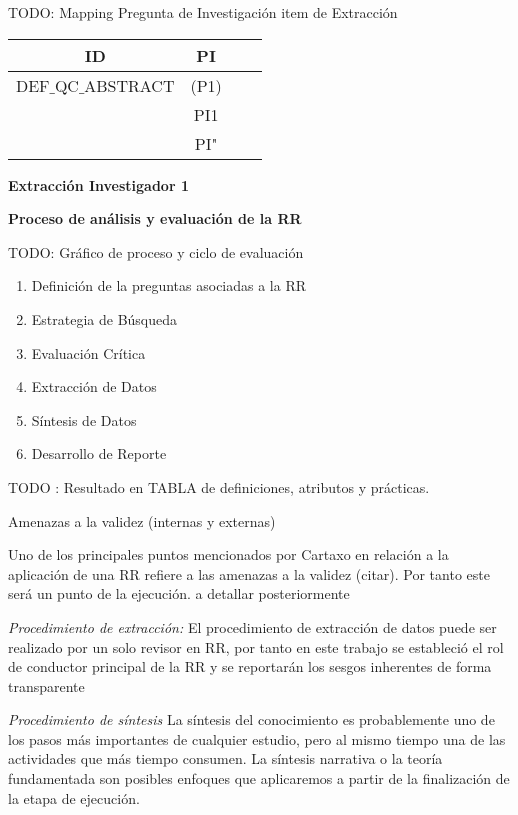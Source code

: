 \documentclass[conference]{IEEEtran}
\begin{document}
TODO: Mapping Pregunta de Investigación item de Extracción 

\begin{center}
\begin{tabular}{ |c|c|c|c| } 
\hline
ID & PI  \\
\hline
DEF$\_$QC$\_$ABSTRACT & (P1) \\ 
& PI1  \\ 
\hline
& PI"  \\ 
\hline
\end{tabular}
\end{center}
\textbf{Extracción Investigador 1}



\textbf{Proceso de análisis y evaluación de la RR}

TODO: Gráfico de proceso y ciclo de evaluación

\begin{enumerate}
\item Definición de la preguntas asociadas a la RR
\item Estrategia de Búsqueda
\item Evaluación Crítica
\item Extracción de Datos
\item Síntesis de Datos
\item Desarrollo de Reporte 
\end{enumerate}

TODO : Resultado en TABLA de 
definiciones, atributos y prácticas. 

{Amenazas a la validez (internas y externas) } 


 
 
 
Uno de los principales puntos mencionados por Cartaxo en relación a la aplicación de una RR refiere a las amenazas a la validez (citar). Por tanto este será un punto de la ejecución.  a detallar posteriormente 

\textit{ Procedimiento de extracción: } El procedimiento de extracción de datos puede ser realizado por un solo revisor en RR, por tanto en este trabajo se estableció el rol de conductor principal de la RR y se reportarán los sesgos inherentes de forma transparente


\textit{Procedimiento de síntesis}
  La síntesis del conocimiento es probablemente uno de los pasos más importantes de cualquier estudio, pero al mismo tiempo una de las actividades que más tiempo consumen. La síntesis narrativa o la teoría fundamentada son posibles enfoques que aplicaremos a partir de la finalización de la etapa de ejecución. 
\end{document}
